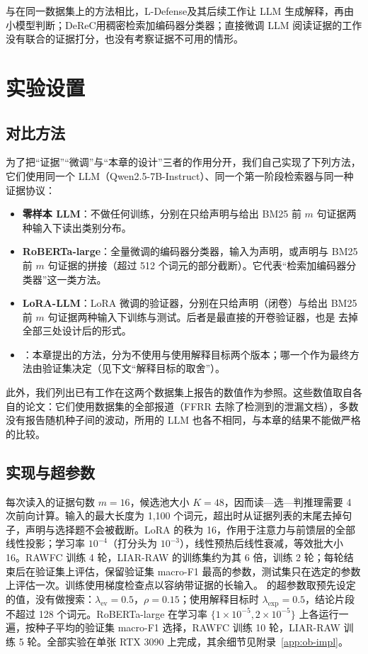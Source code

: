 与在同一数据集上的方法相比，L-Defense\citep{wang2024ldefense}及其后续工作\citep{wang2026gdefense}让 LLM 生成解释，再由小模型判断；DeReC\citep{qazi2025derec}用稠密检索加编码器分类器；直接微调 LLM 阅读证据的工作\citep{cheung2023factllama,kumar2025entailed,wang2025evicheck}没有联合的证据打分，也没有考察证据不可用的情形。

\section{实验设置}\label{sec:ob-setup}

\subsection{对比方法}

为了把“证据”“微调”与“本章的设计”三者的作用分开，我们自己实现了下列方法，它们使用同一个 LLM（Qwen2.5-7B-Instruct）、同一个第一阶段检索器与同一种证据协议：
\begin{itemize}
\item \textbf{零样本 LLM}：不做任何训练，分别在只给声明与给出 BM25 前 $m$ 句证据两种输入下读出类别分布。
\item \textbf{RoBERTa-large}\citep{liu2019roberta}：全量微调的编码器分类器，输入为声明，或声明与 BM25 前 $m$ 句证据的拼接（超过 512 个词元的部分截断）。它代表“检索加编码器分类器”这一类方法\citep{qazi2025derec}。
\item \textbf{LoRA-LLM}：LoRA 微调的验证器，分别在只给声明（闭卷）与给出 BM25 前 $m$ 句证据两种输入下训练与测试。后者是最直接的开卷验证器，也是 \ours{} 去掉全部三处设计后的形式。
\item \textbf{\ours{}}：本章提出的方法，分为不使用与使用解释目标两个版本；哪一个作为最终方法由验证集决定（见下文“解释目标的取舍”）。
\end{itemize}
此外，我们列出已有工作在这两个数据集上报告的数值作为参照。这些数值取自各自的论文：它们使用数据集的全部报道（FFRR 去除了检测到的泄漏文档），多数没有报告随机种子间的波动，所用的 LLM 也各不相同，与本章的结果不能做严格的比较。

\subsection{实现与超参数}

每次读入的证据句数 $m=16$，候选池大小 $K=48$，因而读—选—判推理需要 4 次前向计算。输入的最大长度为 1{,}100 个词元，超出时从证据列表的末尾去掉句子，声明与选择题不会被截断。LoRA 的秩为 16，作用于注意力与前馈层的全部线性投影；学习率 $10^{-4}$（打分头为 $10^{-3}$），线性预热后线性衰减，等效批大小 16。RAWFC 训练 4 轮，LIAR-RAW 的训练集约为其 6 倍，训练 2 轮；每轮结束后在验证集上评估，保留验证集 macro-F1 最高的参数，测试集只在选定的参数上评估一次。训练使用梯度检查点以容纳带证据的长输入。\ours{} 的超参数取预先设定的值，没有做搜索：$\lambda_{\mathrm{ev}}=0.5$，$\rho=0.15$；使用解释目标时 $\lambda_{\mathrm{exp}}=0.5$，结论片段不超过 128 个词元。RoBERTa-large 在学习率 $\{1\times10^{-5},2\times10^{-5}\}$ 上各运行一遍，按种子平均的验证集 macro-F1 选择，RAWFC 训练 10 轮，LIAR-RAW 训练 5 轮。全部实验在单张 RTX 3090 上完成，其余细节见附录~\ref{app:ob-impl}。

